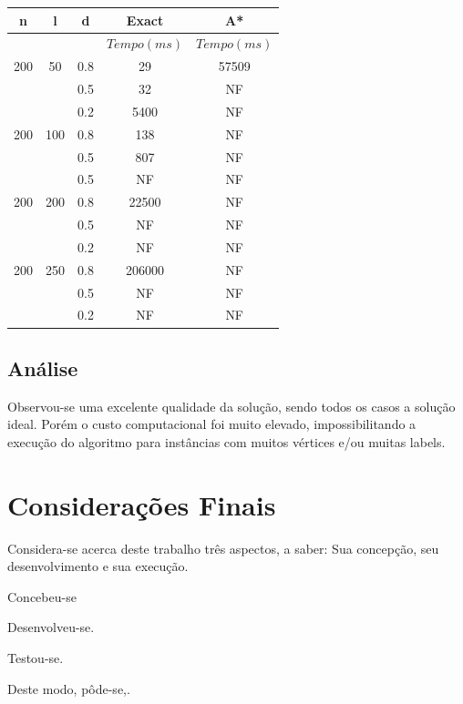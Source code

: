 \documentclass[12pt]{article}
\begin{document}
		\begin{tabular}{c|c|c|c|c} \hline
			n & l & d & Exact & A* \\ \hline
			& & & $Tempo(ms)$ & $Tempo(ms)$\\ \hline
			200 & 50  & 0.8 & 29 & 57509\\
			   &      & 0.5 & 32 & NF\\
			   &      & 0.2 & 5400 & NF\\ \hline
			200 & 100  & 0.8 & 138 & NF \\
			   &      & 0.5 & 807 & NF\\
			   &      & 0.5 & NF & NF\\ \hline
			200 & 200 & 0.8 &  22500 & NF\\
			   &      & 0.5 & NF & NF\\
			   &      & 0.2 & NF & NF\\ \hline
			200 & 250 & 0.8 & 206000 & NF\\
			   &      & 0.5 & NF & NF\\
			   &      & 0.2 & NF & NF\\ \hline
		\end{tabular}

	\subsection{Análise}\label{sec:analise}

Observou-se uma excelente qualidade da solução, sendo todos os casos a solução ideal. Porém o custo computacional foi muito elevado, impossibilitando a execução do algoritmo para instâncias com muitos vértices e/ou muitas labels.

\section{Considerações Finais}\label{sec:conclusao}
	
	Considera-se acerca deste trabalho três aspectos, a saber: Sua concepção, seu desenvolvimento e sua execução.

	Concebeu-se

	Desenvolveu-se.

	Testou-se.

	Deste modo, pôde-se,.




\end{document}
